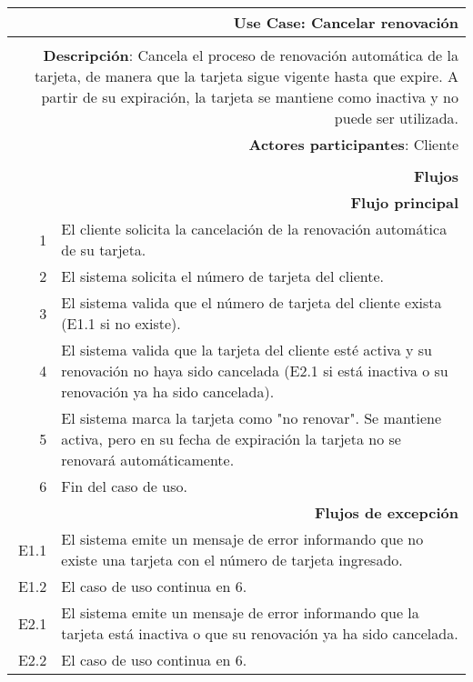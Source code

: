 \begin{tabularx}{\textwidth}{| r | X |}
\hline
\multicolumn{2}{|X|}{
\textbf{Use Case}: Cancelar renovación} \\

\hline
\multicolumn{2}{|c|}{\cellcolor[gray]{0.6}} \\

\hline
\multicolumn{2}{|X|}{
\textbf{Descripción}: Cancela el proceso de renovación automática de la tarjeta,
de manera que la tarjeta sigue vigente hasta que expire. A partir de su
expiración, la tarjeta se mantiene como inactiva y no puede ser utilizada.} \\

\hline
\multicolumn{2}{|X|}{
\textbf{Actores participantes}: Cliente} \\

\hline
\multicolumn{2}{|c|}{\cellcolor[gray]{0.6} } \\

\hline
\multicolumn{2}{|X|}{
\textbf{Flujos}} \\

\hline
\multicolumn{2}{|X|}{
\textbf{Flujo principal}} \\

\hline
1 & El cliente solicita la cancelación de la renovación automática de su
tarjeta. \\
\hline
2 & El sistema solicita el número de tarjeta del cliente. \\
\hline
3 & El sistema valida que el número de tarjeta del cliente exista (E1.1 si no
existe). \\
\hline
4 & El sistema valida que la tarjeta del cliente esté activa y su renovación no
haya sido cancelada (E2.1 si está inactiva o su renovación ya ha sido
cancelada). \\
\hline
5 & El sistema marca la tarjeta como "no renovar". Se mantiene activa, pero en
su fecha de expiración la tarjeta no se renovará automáticamente. \\
\hline
6 & Fin del caso de uso. \\

\hline
\multicolumn{2}{|X|}{
\textbf{Flujos de excepción}} \\

\hline
E1.1 & El sistema emite un mensaje de error informando que no existe una tarjeta
con el número de tarjeta ingresado. \\
\hline
E1.2 & El caso de uso continua en 6. \\

\hline
E2.1 & El sistema emite un mensaje de error informando que la tarjeta está
inactiva o que su renovación ya ha sido cancelada. \\
\hline
E2.2 & El caso de uso continua en 6. \\

\hline
\end{tabularx}

